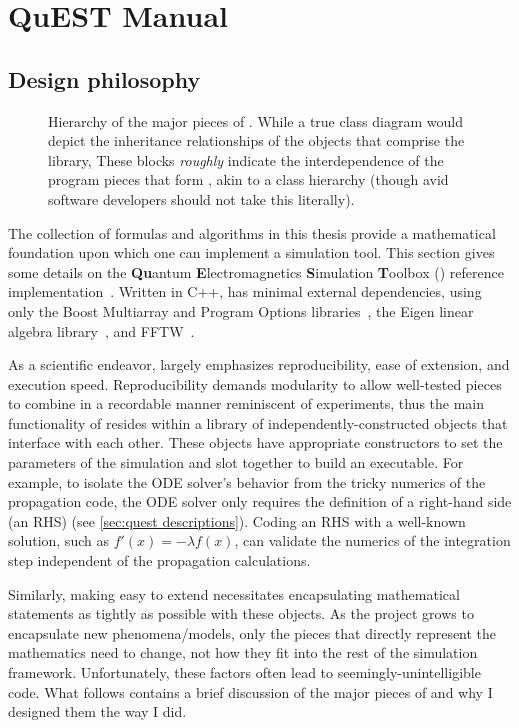 \chapter{QuEST Manual}

\section{Design philosophy}

\begin{figure}
  \centering
  \caption{\label{fig:hierarchy}Hierarchy of the major pieces of \QuEST{}.
    While a true class diagram would depict the inheritance relationships of the objects that comprise the \QuEST{} library, 
  These blocks \emph{roughly} indicate the interdependence of the program pieces that form \QuEST{}, akin to a class hierarchy (though avid software developers should not take this literally).}
\end{figure}

The collection of formulas and algorithms in this thesis provide a mathematical foundation upon which one can implement a simulation tool. This section gives some details on the \textbf{Qu}antum \textbf{E}lectromagnetics \textbf{S}imulation \textbf{T}oolbox (\QuEST{}) reference implementation~\cite{github}. Written in C++, \QuEST{} has minimal external dependencies, using only the Boost Multiarray and Program Options libraries~\cite{boost}, the Eigen linear algebra library~\cite{eigen}, and FFTW~\cite{FFTW}.

As a scientific endeavor, \QuEST{} largely emphasizes reproducibility, ease of extension, and execution speed.
Reproducibility demands modularity to allow well-tested pieces to combine in a recordable manner reminiscent of experiments, thus the main functionality of \QuEST{} resides within a library of independently-constructed objects that interface with each other.
These objects have appropriate constructors to set the parameters of the simulation and slot together to build an executable.
For example, to isolate the ODE solver's behavior from the tricky numerics of the propagation code, the ODE solver only requires the definition of a right-hand side (an RHS) (see \cref{sec:quest descriptions}).
Coding an RHS with a well-known solution, such as $f'(x) = - \lambda f(x)$, can validate the numerics of the integration step independent of the propagation calculations.

Similarly, making \QuEST{} easy to extend necessitates encapsulating mathematical statements as tightly as possible with these objects.
As the project grows to encapsulate new phenomena/models, only the pieces that directly represent the mathematics need to change, not how they fit into the rest of the simulation framework.
Unfortunately, these factors often lead to seemingly-unintelligible code. What follows contains a brief discussion of the major pieces of \QuEST{} and why I designed them the way I did.

